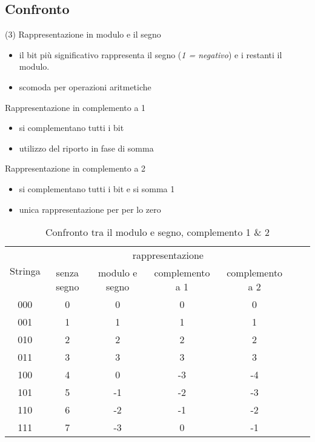 \subsection{Confronto}
\begin{tasks}(3)
	\task Rappresentazione in modulo e il segno
	\begin{itemize}
		\item il bit più significativo rappresenta il segno (\textit{1 =
			negativo}) e i restanti il modulo.
		\item scomoda per operazioni aritmetiche
	\end{itemize}
	\task Rappresentazione in complemento a 1
	\begin{itemize}
		\item si complementano tutti i bit
		\item utilizzo del riporto in fase di somma
	\end{itemize}
	\task Rappresentazione in complemento a 2
	\begin{itemize}
		\item si complementano tutti i bit e si somma 1
		\item unica rappresentazione per per lo zero
	\end{itemize}
\end{tasks}
\begin{table}[h!]
	\centering
	\begin{tabular}{|c|c|c|c|c|c|c|}
		\hline
		\multirow{2}{*}{Stringa}&\multicolumn{4}{c|}{rappresentazione}\\
		&senza segno&modulo e segno&complemento a 1&complemento a 2\\\hline
		000&0&0&0&0\\\hline
		001&1&1&1&1\\\hline
		010&2&2&2&2\\\hline
		011&3&3&3&3\\\hline
		100&4&0&-3&-4\\\hline
		101&5&-1&-2&-3\\\hline
		110&6&-2&-1&-2\\\hline
		111&7&-3&0&-1\\\hline
	\end{tabular}
	\caption {Confronto tra il modulo e segno, complemento 1 \& 2}
\end{table}

